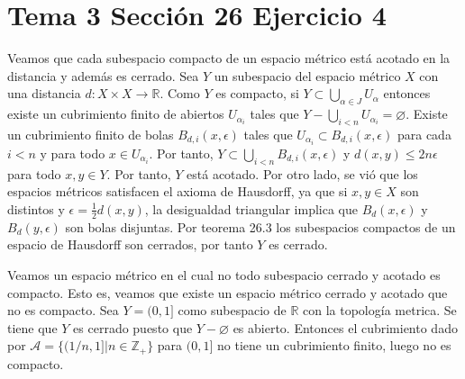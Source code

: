 \documentclass{article}
\begin{document}
\section{Tema 3 Sección 26 Ejercicio 4}
Veamos que cada subespacio compacto de un espacio métrico está acotado en la distancia y además es cerrado. Sea $Y$ un subespacio del espacio métrico $X$ con una distancia $d:X\times X\rightarrow \mathbb{R}$. Como $Y$ es compacto, si $Y\subset\bigcup_{\alpha\in J} U_\alpha$ entonces existe un cubrimiento finito de abiertos $U_{\alpha_i}$ tales que $Y-\bigcup_{i<n} U_{\alpha_i}=\varnothing$. Existe un cubrimiento finito de bolas $B_{d,i}(x,\epsilon)$ tales que $U_{\alpha_i}\subset B_{d,i}(x,\epsilon)$ para cada $i<n$ y para todo $x\in U_{\alpha_i}$. Por tanto, $Y\subset \bigcup_{i<n} B_{d,i}(x,\epsilon)$ y $d(x,y)\leq 2n\epsilon$ para todo $x,y\in Y$. Por tanto, $Y$ está acotado. Por otro lado, se vió que los espacios métricos satisfacen el axioma de Hausdorff, ya que si $x,y\in X$ son distintos y $\epsilon=\frac{1}{2}d(x,y)$, la desigualdad triangular implica que $B_d(x,\epsilon)$ y $B_d(y,\epsilon)$ son bolas disjuntas. Por teorema 26.3  los subespacios compactos de un espacio de Hausdorff son cerrados, por tanto $Y$ es cerrado.

Veamos un espacio métrico en el cual no todo subespacio cerrado y acotado es compacto. Esto es, veamos que existe un espacio métrico cerrado y acotado que no es compacto. Sea $Y=(0,1]$ como subespacio de $\mathbb{R}$ con la topología metrica. Se tiene que $Y$ es cerrado puesto que $Y-\varnothing$ es abierto. Entonces el cubrimiento dado por $\mathcal{A}=\{(1/n,1]|n\in\mathbb{Z}_+\}$ para $(0,1]$ no tiene un cubrimiento finito, luego no es compacto.
\end{document}
